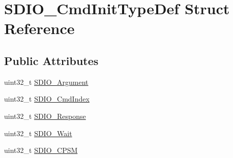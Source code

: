\hypertarget{structSDIO__CmdInitTypeDef}{
\section{SDIO\_\-CmdInitTypeDef Struct Reference}
\label{structSDIO__CmdInitTypeDef}
}
\subsection*{Public Attributes}
\begin{DoxyCompactItemize}
\item 
uint32\_\-t \hyperlink{structSDIO__CmdInitTypeDef_a37dfc4d7191ec10cffdb05ecf58d4807}{SDIO\_\-Argument}
\item 
uint32\_\-t \hyperlink{structSDIO__CmdInitTypeDef_ab5e1df1f0e8d48a308edfb59a6f80fb4}{SDIO\_\-CmdIndex}
\item 
uint32\_\-t \hyperlink{structSDIO__CmdInitTypeDef_aecb203e21321126d5f05c34787cacfd2}{SDIO\_\-Response}
\item 
uint32\_\-t \hyperlink{structSDIO__CmdInitTypeDef_a582258554233ff8550bd04d2d790c67c}{SDIO\_\-Wait}
\item 
uint32\_\-t \hyperlink{structSDIO__CmdInitTypeDef_ab0e869ae285cc132478dd743c28cd8e2}{SDIO\_\-CPSM}
\end{DoxyCompactItemize}


